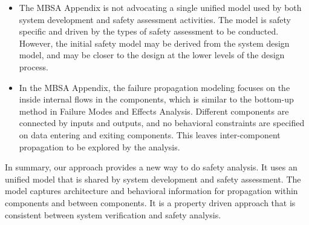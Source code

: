 \begin{itemize}
	\item The MBSA Appendix is not advocating a single unified model used by both system development and safety assessment activities. The model is safety specific and driven by the types of safety assessment to be conducted. However, the initial safety model may be derived from the system design model, and may be closer to the design at the lower levels of the design process.
	\item In the MBSA Appendix, the failure propagation modeling focuses on the inside internal flows in the components, which is similar to the bottom-up method in Failure Modes and Effects Analysis. Different components are connected by inputs and outputs, and no behavioral constraints are specified on data entering and exiting components. This leaves inter-component propagation to be explored by the analysis.
\end{itemize}

In summary, our approach provides a new way to do safety analysis. It uses an unified model that is shared by system development and safety assessment. The model captures architecture and behavioral information for propagation within components and between components. It is a property driven approach that is consistent between system verification and safety analysis.





































